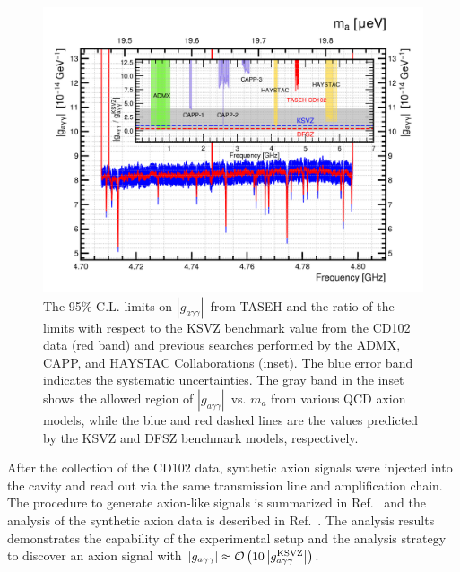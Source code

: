 \documentclass[%
 reprint,prl, %
superscriptaddress,
nobibnotes,
 amsmath,amssymb,
 aps,
]{revtex4-2}
\newcommand{\gagg}{\ensuremath{\left|g_{a\gamma\gamma}\right|}}
\newcommand{\bgagg}{\ensuremath{g_{a\gamma\gamma}}}
\begin{document}
\begin{figure} 
  \centering
  \includegraphics[width=12.9cm]{figures/combineTASEH_all.png}
  \caption{The 95\% C.L. limits on \gagg\ from TASEH and the ratio of the 
limits with respect to the KSVZ benchmark value 
 from the CD102 data (red band) and previous searches performed by the 
 ADMX, CAPP, and HAYSTAC Collaborations (inset). 
 The blue error band indicates the systematic 
  uncertainties. The gray band in the inset shows the allowed region of 
 \gagg\ vs. $m_a$ 
 from various QCD axion models, while the blue and red dashed lines are the 
values predicted by the KSVZ and DFSZ benchmark models, respectively.
 }

  \label{fig:gaggall}
\end{figure}




After the collection of the CD102 data, 
synthetic axion signals were injected into the cavity and read out via the 
same transmission line and amplification chain. 
The procedure to generate axion-like signals is summarized in 
Ref.~\cite{TASEHInstrumentation} and the analysis of the synthetic axion 
data is described in Ref.~\cite{TASEHAnalysis}. 
The analysis results demonstrates
the capability of the experimental setup and the analysis strategy to discover
an axion signal with 
$\gagg\approx {\cal O}\left(10\left|\bgagg^\text{KSVZ}\right|\right)$.
\end{document}

